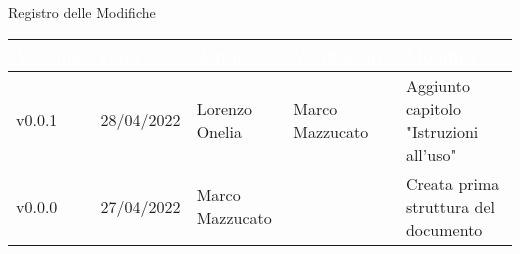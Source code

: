 \begin{center}
  \huge{Registro delle Modifiche}
\end{center}
\renewcommand\arraystretch{1,5}
{\centering
\begin{longtable}{|C{1.8cm}|C{2.1cm}|C{2cm}|C{2.4cm}|L{4.4cm}|}
  \hline
  \textcolor[HTML]{FFFFFF}{\textbf{Versione}} & \textcolor[HTML]{FFFFFF}{\textbf{Data}} & \textcolor[HTML]{FFFFFF}{\textbf{Autore}}  & \textcolor[HTML]{FFFFFF}{\textbf{Verificatore}} & \textcolor[HTML]{FFFFFF}{\textbf{Modifica}}    \\ \hline
  v0.0.1        & 28/04/2022    & Lorenzo Onelia    & Marco Mazzucato       & Aggiunto capitolo "Istruzioni all'uso" \\ \hline
  v0.0.0        & 27/04/2022    & Marco Mazzucato   &          & Creata prima struttura del documento \\ \hline
\end{longtable}}

\renewcommand\arraystretch{1}
